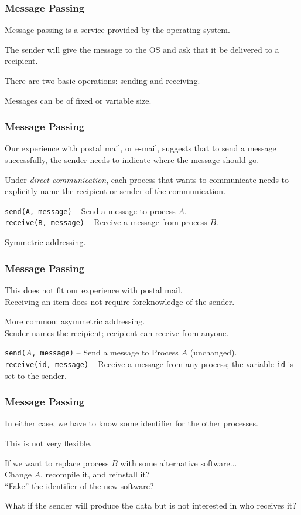 \begin{frame}
	\frametitle{Message Passing}

	Message passing is a service provided by the operating system.

	The sender will give the message to the OS and ask that it be delivered to a recipient.

	There are two basic operations: sending and receiving.

	Messages can be of fixed or variable size.


\end{frame}

\begin{frame}
	\frametitle{Message Passing}

	Our experience with postal mail, or e-mail, suggests that to send a message successfully, the sender needs to indicate where the message should go.

	Under \textit{direct communication}, each process that wants to communicate needs to explicitly name the recipient or sender of the communication.


	\texttt{send(A, message)} -- Send a message to process $A$.\\
	\texttt{receive(B, message)} -- Receive a message from process $B$.

	Symmetric addressing.

\end{frame}

\begin{frame}
	\frametitle{Message Passing}

	This does not fit our experience with postal mail.\\
	\quad Receiving an item does not require foreknowledge of the sender.

	More common: asymmetric addressing.\\
	\quad Sender names the recipient; recipient can receive from anyone.

	\texttt{send($A$, message)} -- Send a message to Process $A$ (unchanged).\\
	\texttt{receive(id, message)} -- Receive a message from any process; the variable \texttt{id} is set to the sender.

\end{frame}

\begin{frame}
	\frametitle{Message Passing}

	In either case, we have to know some identifier for the other processes.

	This is not very flexible.

	If we want to replace process $B$ with some alternative software...\\
	\quad Change $A$, recompile it, and reinstall it?\\
	\quad ``Fake'' the identifier of the new software?

	What if the sender will produce the data but is not interested in who receives it?

\end{frame}

